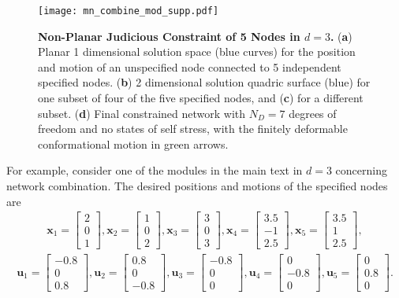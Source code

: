 \documentclass[%
preprint,
 amsmath,amssymb,
 aps,
]{revtex4-1}
\begin{document}
\begin{figure}[h!]
	\centering
	\texttt{[image: mn\_combine\_mod\_supp.pdf]}
	\caption{\textbf{Non-Planar Judicious Constraint of 5 Nodes in $d=3$.} (\textbf{a}) Planar 1 dimensional solution space (blue curves) for the position and motion of an unspecified node connected to 5 independent specified nodes. (\textbf{b}) 2 dimensional solution quadric surface (blue) for one subset of four of the five specified nodes, and (\textbf{c}) for a different subset. (\textbf{d}) Final constrained network with $N_D = 7$ degrees of freedom and no states of self stress, with the finitely deformable conformational motion in green arrows.}
	\label{fig:mn_combine_mod}
\end{figure}

For example, consider one of the modules in the main text in $d=3$ concerning network combination. The desired positions and motions of the specified nodes are
\begin{align*}
\bm{x}_1 = \begin{bmatrix} 2\\0\\1 \end{bmatrix},
\bm{x}_2 = \begin{bmatrix} 1\\0\\2 \end{bmatrix},
\bm{x}_3 = \begin{bmatrix} 3\\0\\3 \end{bmatrix},
\bm{x}_4 = \begin{bmatrix} 3.5\\-1\\2.5 \end{bmatrix},
\bm{x}_5 = \begin{bmatrix} 3.5\\1\\2.5 \end{bmatrix},
\end{align*}
\begin{align*}
\bm{u}_1 = \begin{bmatrix} -0.8\\0\\0.8 \end{bmatrix},
\bm{u}_2 = \begin{bmatrix} 0.8\\0\\-0.8 \end{bmatrix},
\bm{u}_3 = \begin{bmatrix} -0.8\\0\\0 \end{bmatrix},
\bm{u}_4 = \begin{bmatrix} 0\\-0.8\\0 \end{bmatrix},
\bm{u}_5 = \begin{bmatrix} 0\\0.8\\0 \end{bmatrix}.
\end{align*}
\end{document}
